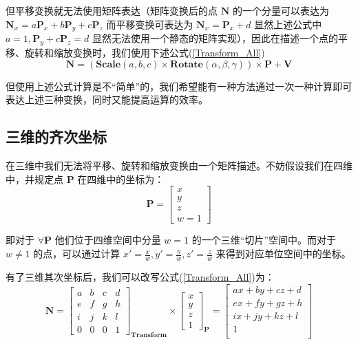 \documentclass[12pt,oneside,a4paper]{ctexart}
\begin{document}
但平移变换就无法使用矩阵表达（矩阵变换后的点 $\mathbf{N}$ 的一个分量可以表达为 $\mathbf{N}_x=a\mathbf{P}_x+b\mathbf{P}_y+c\mathbf{P}_z$ 而平移变换可表达为 $\mathbf{N}_x=\mathbf{P}_x+d$ 显然上述公式中 $a=1, \mathbf{P}_y+c\mathbf{P}_z=d$ 显然无法使用一个静态的矩阵实现），因此在描述一个点的平移、旋转和缩放变换时，我们使用下述公式(\ref{Transform_All})
\begin{equation}
	\mathbf{N}=
	(
	\mathbf{Scale}(a,b,c)
	\times
	\mathbf{Rotate}(\alpha,\beta,\gamma)
	)\times
	\mathbf{P}
	+
	\mathbf{V}
	\label{Transform_All}
\end{equation}

但使用上述公式计算是不“简单”的，我们希望能有一种方法通过一次一种计算即可表达上述三种变换，同时又能提高运算的效率。
\subsection{三维的齐次坐标}
在三维中我们无法将平移、旋转和缩放变换由一个矩阵描述。不妨假设我们在四维中，并规定点 $\mathbf{P}$ 在四维中的坐标为：
\begin{equation*}
	\mathbf{P}=
	\begin{bmatrix}
		x \\
		y \\
		z \\
		w=1
	\end{bmatrix}
\end{equation*}

即对于 $\forall{}\mathbf{P}$ 他们位于四维空间中分量 $w=1$ 的一个三维“切片”空间中。而对于 $w\neq 1$ 的点，可以通过计算 $x'=\frac{x}{w}, y'=\frac{y}{w}, z'=\frac{z}{w}$ 来得到对应单位空间中的坐标。

有了三维其次坐标后，我们可以改写公式(\ref{Transform_All})为：
\begin{equation}
	\mathbf{N} =
	\begin{bmatrix}
		a & b & c & d \\
		e & f & g & h \\
		i & j & k & l \\
		0 & 0 & 0 & 1
	\end{bmatrix}_{\mathbf{Transform}}
	\times
	\begin{bmatrix}
		x \\
		y \\
		z \\
		1
	\end{bmatrix}_{\mathbf{P}}
	=
	\begin{bmatrix}
		ax+by+cz+d \\
		ex+fy+gz+h \\
		ix+jy+kz+l \\
		1          \\
	\end{bmatrix}
	\label{Transform_All_New}
\end{equation}
\end{document}
